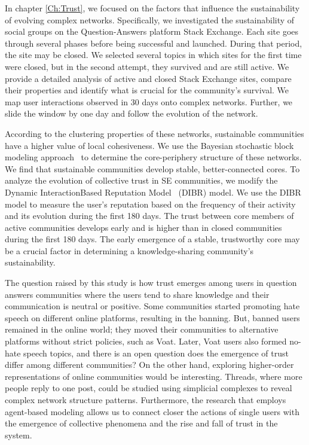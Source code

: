 In chapter \ref{Ch:Trust}, we focused on the factors that influence the sustainability of evolving complex networks. Specifically, we investigated the sustainability of social groups on the Question-Answers platform Stack Exchange. 
Each site goes through several phases before being successful and launched. During that period, the site may be closed. We selected several topics in which sites for the first time were closed, but in the second attempt, they survived and are still active. We provide a detailed analysis of active and closed Stack Exchange sites, compare their properties and identify what is crucial for the community's survival. We map user interactions observed in 30 days onto complex networks. Further, we slide the window by one day and follow the evolution of the network. 

According to the clustering properties of these networks, sustainable communities have a higher value of local cohesiveness. We use the Bayesian stochastic block modeling approach~\cite{gallagher2020clarified} to determine the core-periphery structure of these networks. We find that sustainable communities develop stable, better-connected cores. To analyze the evolution of collective trust in SE communities, we modify the Dynamic InteractionBased Reputation Model~\cite{melnikov2018toward} (DIBR) model. We use the DIBR model to measure the user's reputation based on the frequency of their activity and its evolution during the first 180 days. The trust between core members of active communities develops early and is higher than in closed communities during the first 180 days. The early emergence of a stable, trustworthy core may be a crucial factor in determining a knowledge-sharing community's sustainability. 

The question raised by this study is how trust emerges among users in question answers communities where the users tend to share knowledge and their communication is neutral or positive. Some communities started promoting hate speech on different online platforms, resulting in the banning. But, banned users remained in the online world; they moved their communities to alternative platforms without strict policies, such as Voat. Later, Voat users also formed no-hate speech topics, and there is an open question does the emergence of trust differ among different communities? On the other hand, exploring higher-order representations of online communities would be interesting. Threads, where more people reply to one post, could be studied using simplicial complexes to reveal complex network structure patterns. Furthermore, the research that employs agent-based modeling allows us to connect closer the actions of single users with the emergence of collective phenomena and the rise and fall of trust in the system. 

